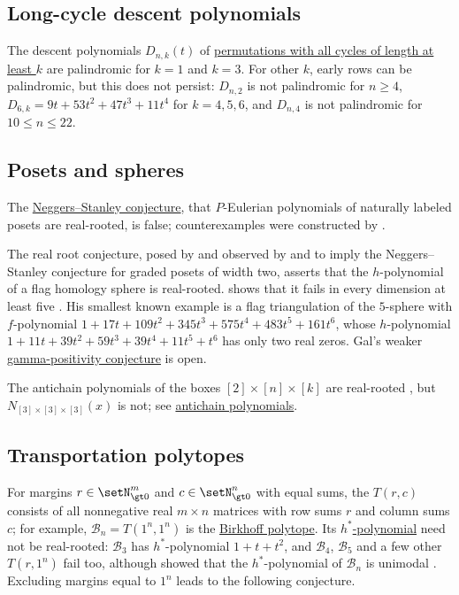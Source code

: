 \subsection[counterexamplesPalindromic]{Long-cycle descent polynomials}

The descent polynomials $D_{n,k}(t)$ of
\hyperref[conjLongCycleDescents]{permutations with all cycles of length at
least $k$} are palindromic for $k=1$ and $k=3$.  For other $k$, early rows
can be palindromic, but this does not persist: $D_{n,2}$ is not palindromic
for $n\geq4$, $D_{6,k}=9t+53t^2+47t^3+11t^4$ for $k=4,5,6$, and
$D_{n,4}$ is not palindromic for $10\leq n\leq 22$.

\subsection[counterexamplesPosets]{Posets and spheres}

The \hyperref[neggersStanleyConjecture]{Neggers--Stanley conjecture}, that
$P$-Eulerian polynomials of naturally labeled posets are real-rooted, is
false; counterexamples were constructed by 
\cite{Stembridge2007NeggersStanleyCounter}.

The real root conjecture, posed by  and
observed by  and  to imply the
Neggers--Stanley conjecture for graded posets of width two, asserts that the
$h$-polynomial of a flag homology sphere is real-rooted.
 shows that it fails in every dimension at least five
\cite{Gal2005}.  His smallest known example is a flag triangulation of the
$5$-sphere with $f$-polynomial
$1+17t+109t^2+345t^3+575t^4+483t^5+161t^6$, whose $h$-polynomial
$1+11t+39t^2+59t^3+39t^4+11t^5+t^6$ has only two real zeros.  Gal's
weaker \hyperref[galConjecture]{gamma-positivity conjecture} is open.

The antichain polynomials of the boxes $[2]\times[n]\times[k]$ are
real-rooted \cite{Jiang2026x}, but
$N_{[3]\times[3]\times[3]}(x)$ is not; see
\hyperref[antichainBoxStability]{antichain polynomials}.

\subsection[counterexamplesTransportation]{Transportation polytopes}

For margins $r\in\setN_{\gt0}^m$ and $c\in\setN_{\gt0}^n$ with equal sums,
the \label{transportationPolytope}
$T(r,c)$ consists of all nonnegative real $m\times n$ matrices with row sums
$r$ and column sums $c$; for example,
$\mathcal{B}_n=T(1^n,1^n)$ is the
\hyperref[birkhoffPolytopeDefinition]{Birkhoff polytope}.  Its
\hyperref[hStarPolynomial]{$h^*$-polynomial} need not be real-rooted:
$\mathcal{B}_3$ has $h^*$-polynomial $1+t+t^2$, and $\mathcal{B}_4$,
$\mathcal{B}_5$ and a few other $T(r,1^n)$ fail too, although
 showed that the $h^*$-polynomial of
$\mathcal{B}_n$ is unimodal \cite{Athanasiadis2005}.  Excluding
margins equal to $1^n$ leads to the following conjecture.

